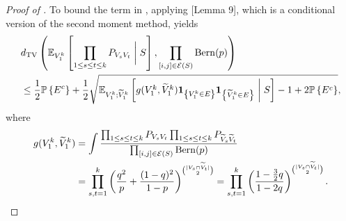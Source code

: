 \begin{proof}[Proof of ]
To bound the term in , applying \cite{HajekWuXu14}[Lemma 9], which is a conditional version of the second moment method, yields
\begin{align}
& d_{\rm TV}  \left( \mathbb{E}_{V_1^k } \left [ \prod_{1 \le s \le t \le k} P_{V_sV_t}\biggm \vert S \right],\prod_{[i,j] \in {\mathcal{E}}(S) } {\rm Bern}(p)  \right) \nonumber\\
& \le \frac{1}{2} \mathbb{P}\left\{ E^c \right\} + \frac{1}{2}
\sqrt{\mathbb{E}_{  V_1^k; {\widetilde{V}}_1^k} \left[ g (V_1^k , {\widetilde{V}}_1^k) {\mathbf{1}_{\left\{{V_1^k \in E}\right\}}}{\mathbf{1}_{\left\{{{\widetilde{V}}_1^k \in E}\right\}}} \biggm \vert S  \right] -1 + 2 \mathbb{P}\left\{ E^c \right\}}, \label{eq:mixturebound}
\end{align}
where
\begin{align*}
g (V_1^k , {\widetilde{V}}_1^k) &= \int \frac{\prod_{1 \le s \le t \le k} P_{V_sV_t} \prod_{1 \le s \le t \le k} P_{{\widetilde{V}}_s {\widetilde{V}}_t}} {\prod_{[i,j]\in {\mathcal{E}}(S)} {\rm Bern}(p) } \\
& =  \prod_{s,t=1}^k \left( \frac{q^2}{p} + \frac{(1-q)^2}{1-p} \right)^{ \binom{|V_s \cap {\widetilde{V}}_t | }{2} } = \prod_{s,t=1}^k\left( \frac{1-\frac{3}{2} q }{1-2q} \right)^{ \binom{|V_s \cap {\widetilde{V}}_t | }{2} }.
\end{align*}

\end{proof}
